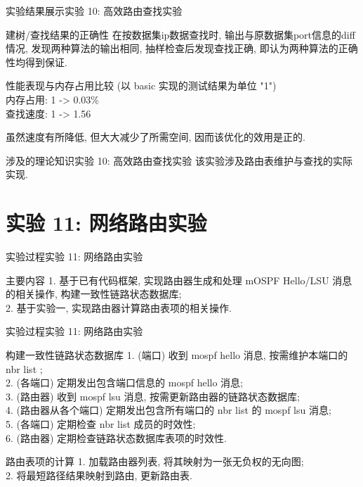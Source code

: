 \documentclass{beamer}
\begin{document}
\begin{frame}{实验结果展示}{实验 10: 高效路由查找实验}\
    \begin{block}{建树/查找结果的正确性}
        在按数据集ip数据查找时, 输出与原数据集port信息的diff情况,
        发现两种算法的输出相同, 抽样检查后发现查找正确,
        即认为两种算法的正确性均得到保证.
    \end{block}
    \begin{block}{性能表现与内存占用比较}
        (以 basic 实现的测试结果为单位 "1")\\
        内存占用: 1 -> 0.03\% \\
        查找速度: 1 -> 1.56
    \end{block}
    虽然速度有所降低, 但大大减少了所需空间,
    因而该优化的效用是正的.
\end{frame}

\begin{frame}{涉及的理论知识}{实验 10: 高效路由查找实验}
    该实验涉及路由表维护与查找的实际实现.
\end{frame}

\section{实验 11: 网络路由实验}
\begin{frame}
    \sectionpage
\end{frame}

\begin{frame}{实验过程}{实验 11: 网络路由实验}
    \begin{block}{主要内容}
        1. 基于已有代码框架,
        实现路由器生成和处理 mOSPF Hello/LSU 消息的相关操作,
        构建一致性链路状态数据库;\\
        2. 基于实验一, 实现路由器计算路由表项的相关操作.
    \end{block}
\end{frame}
\begin{frame}{实验过程}{实验 11: 网络路由实验}
    \begin{block}{构建一致性链路状态数据库}
        1. (端口) 收到 mospf hello 消息, 按需维护本端口的 nbr list ;\\
        2. (各端口) 定期发出包含端口信息的 mospf hello 消息;\\
        3. (路由器) 收到 mospf lsu 消息,
        按需更新路由器的链路状态数据库;\\
        4. (路由器从各个端口)
        定期发出包含所有端口的 nbr list 的 mospf lsu 消息;\\
        5. (各端口) 定期检查 nbr list 成员的时效性;\\
        6. (路由器) 定期检查链路状态数据库表项的时效性.
    \end{block}
    \begin{block}{路由表项的计算}
        1. 加载路由器列表, 将其映射为一张无负权的无向图;\\
        2. 将最短路径结果映射到路由, 更新路由表.
    \end{block}
\end{frame}
\end{document}
